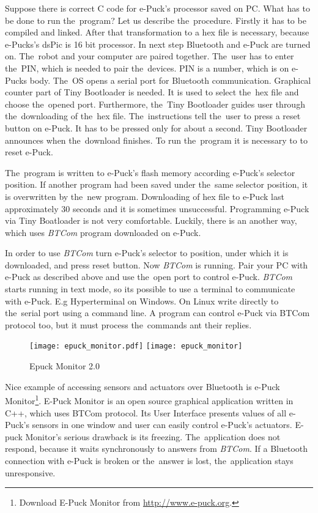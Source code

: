   Suppose there is correct C code for e-Puck's processor saved on PC. What has to be done to run the~program?
  Let us describe the~procedure.
  Firstly it has to be compiled and linked. After that transformation to a hex file is necessary,
  because e-Pucks's dsPic is 16 bit processor. In next step Bluetooth and e-Puck are turned on. 
  The~robot and your computer are paired together. The~user has to enter the~PIN, 
  which is needed to pair the~devices. 
  PIN is a number, which is on e-Pucks body.
  The~OS opens a serial port for Bluetooth communication.
  Graphical counter part of Tiny Bootloader is needed. It is used to select the~hex file and choose the~opened port. 
  Furthermore, the~Tiny Bootloader guides user through the~downloading of the~hex file.
  The~instructions tell the~user to press a reset button on e-Puck. It has to be pressed only for about a second.
  Tiny Bootloader announces when the~download finishes. To run the~program it is necessary to to reset e-Puck.
   
  The~program is written to e-Puck's flash memory according e-Puck's selector position.
  If another program had been saved under the~same selector position, it is overwritten by the~new program.
  Downloading of hex file to e-Puck last approximately 30 seconds and it is sometimes unsuccessful. 
  Programming e-Puck via Tiny Boatloader is not very comfortable. 
  Luckily, there is an another way, which uses {\it BTCom} program downloaded on e-Puck. 

  In order to use {\it BTCom} turn e-Puck's selector to position, under which it is downloaded, and press reset button.
  Now {\it BTCom} is running.  Pair your PC with e-Puck as described above and use the~open port
  to control e-Puck.
  {\it BTCom} starts running in text mode, so its possible to use a terminal to communicate with e-Puck.
  E.g Hyperterminal on Windows. On Linux write directly to the~serial port using a command line.
  A program can control e-Puck via BTCom protocol too, but it must process the~commands ant their replies.
   

  \begin{figure}[hbp]
  \centering
  \ifpdf
    \texttt{[image: epuck\_monitor.pdf]}
  \else
    \texttt{[image: epuck\_monitor]}
  \fi
  \caption{\label{pic:monitor}%
   Epuck Monitor 2.0}
  \end{figure}

  Nice example of accessing sensors and actuators over Bluetooth is 
  e-Puck Monitor\footnote{\small{Download E-Puck Monitor from \url{http://www.e-puck.org}.}}.
  E-Puck Monitor is an open source graphical application written in C++, 
  which uses BTCom protocol. Its User Interface presents values of all e-Puck's 
  sensors in one window and user can easily control e-Puck's actuators.
  E-puck Monitor's serious drawback is its freezing. The~application does not respond, 
  because it waits synchronously to answers from {\it BTCom}.
  If a Bluetooth connection with e-Puck is broken or the~answer is lost, 
  the~application stays unresponsive.

